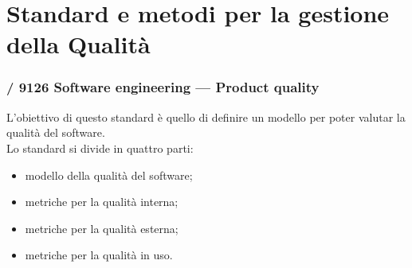 \section{Standard e metodi per la gestione della Qualità}
  \subsubsection{/ 9126 Software engineering — Product quality}
  L'obiettivo di questo standard è quello di definire un modello per poter valutar la qualità del software.\\
  Lo standard si divide in quattro parti:
  \begin{itemize}
    \item modello della qualità del software;
    \item metriche per la qualità interna;
    \item metriche per la qualità esterna;
    \item metriche per la qualità in uso.
  \end{itemize}
